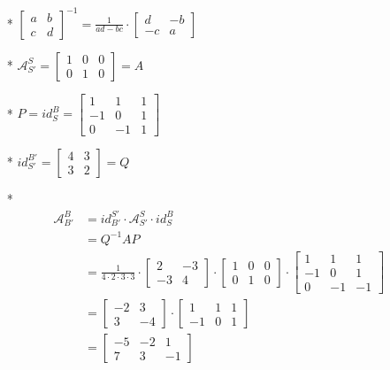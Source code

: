 \documentclass[a4paper,12pt]{article}
\newcommand{\A}{\mathcal{A}}
\begin{document}
\begin{itemize}
	\begin{itemize}
		\item[*] $\begin{bmatrix}
			a&b\\
			c&d
		\end{bmatrix}^{-1}=
		\frac{1}{ad-bc}\cdot \begin{bmatrix}
			d&-b\\
			-c&a
		\end{bmatrix}$
		\item[*] $\A_{S'}^{S}=
		\begin{bmatrix}
			1&0&0\\
			0&1&0
		\end{bmatrix}=A$ 
		\item[*] $P=id_S^B=
		\begin{bmatrix}
			1&1&1\\
			-1&0&1\\
			0&-1&1
		\end{bmatrix}$
		\item[*] $id_{S'}^{B'}=
		\begin{bmatrix}
			4&3\\
			3&2
		\end{bmatrix}=Q$
		\item[*] \begin{align*}
		\A_{B'}^B&=id_{B'}^{S'}\cdot \A_{S'}^S \cdot id_S^B \\
		&= Q^{-1}AP \\
		&= \frac{1}{4\cdot 2\cdot 3\cdot 3} \cdot 
		\begin{bmatrix}
			2&-3\\
			-3&4
		\end{bmatrix} \cdot 
		\begin{bmatrix}
			1&0&0\\
			0&1&0
		\end{bmatrix} \cdot 
		\begin{bmatrix}
			1&1&1\\
			-1&0&1\\
			0&-1&-1
		\end{bmatrix} \\
		&= \begin{bmatrix}
			-2&3\\
			3&-4
		\end{bmatrix} \cdot
		\begin{bmatrix}
			1&1&1\\
			-1&0&1
		\end{bmatrix} \\
		&= \begin{bmatrix}
			-5&-2&1\\
			7&3&-1
		\end{bmatrix}
		\end{align*}
	\end{itemize}
\end{itemize}
\end{document}
